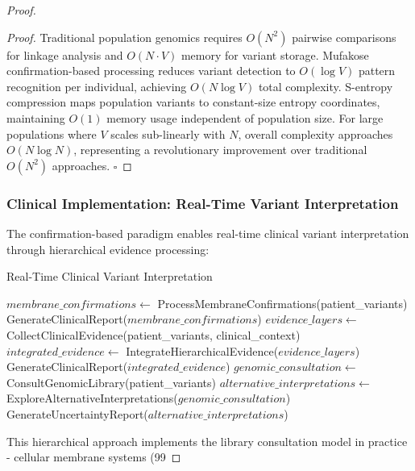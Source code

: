 \documentclass[12pt,a4paper]{article}
\begin{document}
\begin{proof}
\begin{proof}
Traditional population genomics requires $O(N^2)$ pairwise comparisons for linkage analysis and $O(N \cdot V)$ memory for variant storage. Mufakose confirmation-based processing reduces variant detection to $O(\log V)$ pattern recognition per individual, achieving $O(N \log V)$ total complexity. S-entropy compression maps population variants to constant-size entropy coordinates, maintaining $O(1)$ memory usage independent of population size. For large populations where $V$ scales sub-linearly with $N$, overall complexity approaches $O(N \log N)$, representing a revolutionary improvement over traditional $O(N^2)$ approaches. $\square$
\end{proof}

\subsubsection{Clinical Implementation: Real-Time Variant Interpretation}

The confirmation-based paradigm enables real-time clinical variant interpretation through hierarchical evidence processing:

\begin{algorithm}
\caption{Real-Time Clinical Variant Interpretation}
\begin{algorithmic}
    \State $membrane\_confirmations \gets$ ProcessMembraneConfirmations(patient\_variants)
        \State \Return GenerateClinicalReport($membrane\_confirmations$)
    \Else
        \State $evidence\_layers \gets$ CollectClinicalEvidence(patient\_variants, clinical\_context)
        \State $integrated\_evidence \gets$ IntegrateHierarchicalEvidence($evidence\_layers$)
            \State \Return GenerateClinicalReport($integrated\_evidence$)
        \Else
            \State $genomic\_consultation \gets$ ConsultGenomicLibrary(patient\_variants)
            \State $alternative\_interpretations \gets$ ExploreAlternativeInterpretations($genomic\_consultation$)
            \State \Return GenerateUncertaintyReport($alternative\_interpretations$)
        \EndIf
    \EndIf
\EndProcedure
\end{algorithmic}
\end{algorithm}

This hierarchical approach implements the library consultation model in practice - cellular membrane systems (99%


\end{proof}
\end{document}
